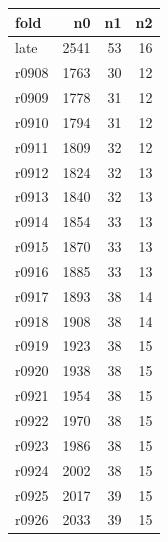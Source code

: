 \begin{tabular}{lrrr}
\toprule
fold & n0 & n1 & n2 \\
\midrule
late & 2541 & 53 & 16 \\
r0908 & 1763 & 30 & 12 \\
r0909 & 1778 & 31 & 12 \\
r0910 & 1794 & 31 & 12 \\
r0911 & 1809 & 32 & 12 \\
r0912 & 1824 & 32 & 13 \\
r0913 & 1840 & 32 & 13 \\
r0914 & 1854 & 33 & 13 \\
r0915 & 1870 & 33 & 13 \\
r0916 & 1885 & 33 & 13 \\
r0917 & 1893 & 38 & 14 \\
r0918 & 1908 & 38 & 14 \\
r0919 & 1923 & 38 & 15 \\
r0920 & 1938 & 38 & 15 \\
r0921 & 1954 & 38 & 15 \\
r0922 & 1970 & 38 & 15 \\
r0923 & 1986 & 38 & 15 \\
r0924 & 2002 & 38 & 15 \\
r0925 & 2017 & 39 & 15 \\
r0926 & 2033 & 39 & 15 \\
\bottomrule
\end{tabular}
